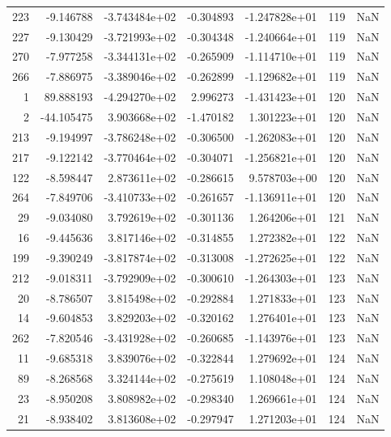 \begin{tabular}{rrrrrrr}
 223 &  -9.146788 & -3.743484e+02 & -0.304893 & -1.247828e+01 &         119 & NaN \\
 227 &  -9.130429 & -3.721993e+02 & -0.304348 & -1.240664e+01 &         119 & NaN \\
 270 &  -7.977258 & -3.344131e+02 & -0.265909 & -1.114710e+01 &         119 & NaN \\
 266 &  -7.886975 & -3.389046e+02 & -0.262899 & -1.129682e+01 &         119 & NaN \\
   1 &  89.888193 & -4.294270e+02 &  2.996273 & -1.431423e+01 &         120 & NaN \\
   2 & -44.105475 &  3.903668e+02 & -1.470182 &  1.301223e+01 &         120 & NaN \\
 213 &  -9.194997 & -3.786248e+02 & -0.306500 & -1.262083e+01 &         120 & NaN \\
 217 &  -9.122142 & -3.770464e+02 & -0.304071 & -1.256821e+01 &         120 & NaN \\
 122 &  -8.598447 &  2.873611e+02 & -0.286615 &  9.578703e+00 &         120 & NaN \\
 264 &  -7.849706 & -3.410733e+02 & -0.261657 & -1.136911e+01 &         120 & NaN \\
  29 &  -9.034080 &  3.792619e+02 & -0.301136 &  1.264206e+01 &         121 & NaN \\
  16 &  -9.445636 &  3.817146e+02 & -0.314855 &  1.272382e+01 &         122 & NaN \\
 199 &  -9.390249 & -3.817874e+02 & -0.313008 & -1.272625e+01 &         122 & NaN \\
 212 &  -9.018311 & -3.792909e+02 & -0.300610 & -1.264303e+01 &         123 & NaN \\
  20 &  -8.786507 &  3.815498e+02 & -0.292884 &  1.271833e+01 &         123 & NaN \\
  14 &  -9.604853 &  3.829203e+02 & -0.320162 &  1.276401e+01 &         123 & NaN \\
 262 &  -7.820546 & -3.431928e+02 & -0.260685 & -1.143976e+01 &         123 & NaN \\
  11 &  -9.685318 &  3.839076e+02 & -0.322844 &  1.279692e+01 &         124 & NaN \\
  89 &  -8.268568 &  3.324144e+02 & -0.275619 &  1.108048e+01 &         124 & NaN \\
  23 &  -8.950208 &  3.808982e+02 & -0.298340 &  1.269661e+01 &         124 & NaN \\
  21 &  -8.938402 &  3.813608e+02 & -0.297947 &  1.271203e+01 &         124 & NaN \\

\end{tabular}

